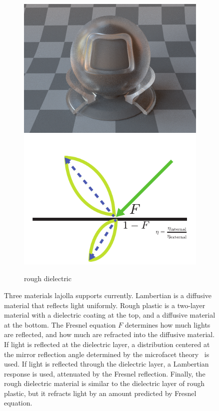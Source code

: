 \documentclass{article}
\begin{document}
\begin{figure}
\begin{subfigure}[t]{0.32\linewidth}
\begin{minipage}[t]{\linewidth}
            \includegraphics[width=\linewidth]{imgs/roughdielectric_render.png}
            \includegraphics[width=\linewidth]{imgs/roughdielectric.pdf}
        \end{minipage}
        \caption{rough dielectric}
        \label{fig:rough_dielectric}
    \end{subfigure}
    \caption{Three materials lajolla supports currently. Lambertian is a diffusive material that reflects light uniformly. Rough plastic is a two-layer material with a dielectric coating at the top, and a diffusive material at the bottom. The Fresnel equation $F$ determines how much lights are reflected, and how much are refracted into the diffusive material. If light is reflected at the dielectric layer, a distribution centered at the mirror reflection angle determined by the microfacet theory~\cite{Cook:1982:RMC} is used. If light is reflected through the dielectric layer, a Lambertian response is used, attenuated by the Fresnel reflection. Finally, the rough dielectric material is similar to the dielectric layer of rough plastic, but it refracts light by an amount predicted by Fresnel equation.}
    \label{fig:materials}
\end{figure}
\end{document}
